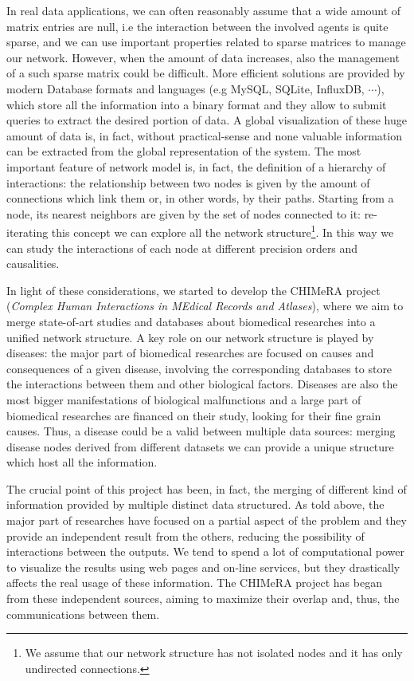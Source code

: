 \documentclass{standalone}
\begin{document}
In real data applications, we can often reasonably assume that a wide amount of matrix entries are null, i.e the interaction between the involved agents is quite sparse, and we can use important properties related to sparse matrices to manage our network.
However, when the amount of data increases, also the management of a such sparse matrix could be difficult.
More efficient solutions are provided by modern Database formats and languages (e.g \textsf{MySQL}, \textsf{SQLite}, \textsf{InfluxDB}, $\cdots$), which store all the information into a binary format and they allow to submit queries to extract the desired portion of data.
A global visualization of these huge amount of data is, in fact, without practical-sense and none valuable information can be extracted from the global representation of the system.
The most important feature of network model is, in fact, the definition of a hierarchy of interactions: the relationship between two nodes is given by the amount of connections which link them or, in other words, by their paths.
Starting from a node, its nearest neighbors are given by the set of nodes connected to it: re-iterating this concept we can explore all the network structure\footnote{
  We assume that our network structure has not isolated nodes and it has only undirected connections.
}.
In this way we can study the interactions of each node at different precision orders and causalities.

In light of these considerations, we started to develop the \textsf{CHIMeRA} project (\emph{Complex Human Interactions in MEdical Records and Atlases}), where we aim to merge state-of-art studies and databases about biomedical researches into a unified network structure.
A key role on our network structure is played by diseases: the major part of biomedical researches are focused on causes and consequences of a given disease, involving the corresponding databases to store the interactions between them and other biological factors.
Diseases are also the most bigger manifestations of biological malfunctions and a large part of biomedical researches are financed on their study, looking for their fine grain causes.
Thus, a disease could be a valid  between multiple data sources: merging disease nodes derived from different datasets we can provide a unique structure which host all the information.

The crucial point of this project has been, in fact, the merging of different kind of information provided by multiple distinct data structured.
As told above, the major part of researches have focused on a partial aspect of the problem and they provide an independent result from the others, reducing the possibility of interactions between the outputs.
We tend to spend a lot of computational power to visualize the results using web pages and on-line services, but they drastically affects the real usage of these information.
The \textsf{CHIMeRA} project has began from these independent sources, aiming to maximize their overlap and, thus, the communications between them.
\end{document}
